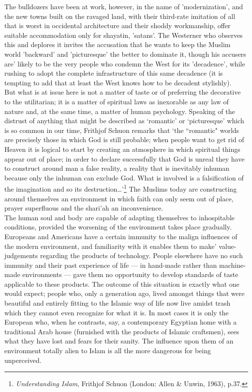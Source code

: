 \documentclass[10pt, twoside]{book}
\begin{document}
The bulldozers have been at work, however, in the name of 'modernization', and the new towns built on 
the ravaged land, with their third\hyp{}rate imitation of all that is worst in occidental architecture and 
their shoddy workmanship, offer suitable accommodation only for shayatin, 'satans'. The Westerner who 
observes this and deplores it invites the accusation that he wants to keep the Muslim world 
'backward' and 'picturesque' the better to dominate it, though his accusers are' likely to be the 
very people who condemn the West for its 'decadence', while rushing to adopt the complete 
infrastructure of this same decadence (it is tempting to add that at least the West knows how to be 
decadent stylishly). \\

But what is at issue here is not a matter of taste or of preferring the decorative to the 
utilitarian; it is a matter of spiritual laws as inexorable as any law of nature and, at the same 
time, a matter of human psychology. Speaking of the distrust of anything that might be described as 
`romantic' or `picturesque' which is so common in our time, Frithjof Schuon remarks that `the 
``romantic" worlds are precisely those in which God is still probable; when people want to get rid of 
Heaven it is logical to start by creating an atmosphere in which spiritual things appear out of 
place; in order to declare successfully that God is unreal they have to construct around man a false 
reality, a reality that is inevitably inhuman because only the inhuman can exclude God. What is 
involved is a falsification of the imagination and so its destruction\ldots{}'\footnote{\emph{Understanding Islam}, Frithjof Schuon (London: Allen \& Unwin, 1963), p.37.} The Muslims today are 
constructing around themselves an environment in which faith can only seem out of place, prayer 
superfluous and the shari'ah an inconvenience. \\

The human soul and body are capable of adapting themselves to inhospitable conditions, provided the 
worsening of the environment takes place gradually. Europeans and Americans have a certain immunity 
to the malign influences of the modern environment, and familiarity with it enables them to make' 
value\hyp{}judgements regarding the products of technology. People elsewhere have no such immunity and 
their past experience of life --- in hand\hyp{}made rather than machine-made environments --- gave them no 
opportunity to develop standards of taste applicable to these products. The outcome of this situation 
is exactly what one would expect; people who, only a generation ago, lived amongst things that were 
beautiful and entirely fitting to the Islamic way of life now live amidst trash which they cannot 
even recognize for what it is. In most cases it is only the European who, when he contrasts, say, a 
contemporary Egyptian home with a traditional Arab house (furnished with the products of Islamic 
craftsmen), sees what they have lost and fears for their sanity. The influence upon them of an 
environment totally alien to Islam is all the more dangerous for being unperceived. \\
\end{document}

